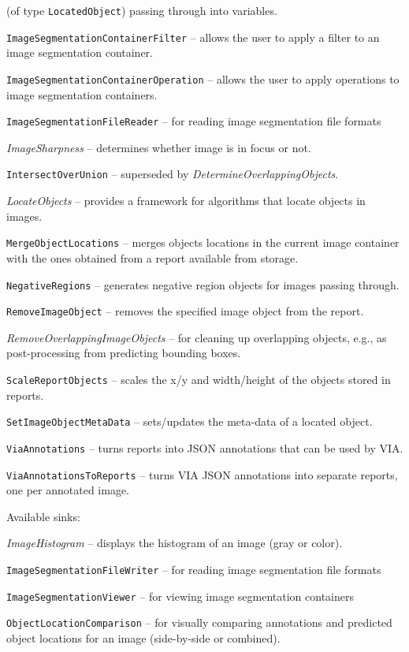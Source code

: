 \documentclass[a4paper]{book}
\begin{document}
\begin{tight_itemize}
  (of type \texttt{LocatedObject}) passing through into variables.
  \item \texttt{ImageSegmentationContainerFilter} -- allows the user to apply a
  filter to an image segmentation container.
  \item \texttt{ImageSegmentationContainerOperation} -- allows the user to apply
  operations to image segmentation containers.
  \item \texttt{ImageSegmentationFileReader} -- for reading image segmentation file formats
  \item \textit{ImageSharpness} -- determines whether image is in focus or not.
  \item \texttt{IntersectOverUnion} -- superseded by \textit{DetermineOverlappingObjects}.
  \item \textit{LocateObjects} -- provides a framework for algorithms that
  locate objects in images.
  \item \texttt{MergeObjectLocations} -- merges objects locations
  in the current image container with the ones obtained from a report
  available from storage.
  \item \texttt{NegativeRegions} -- generates negative region objects
  for images passing through.
  \item \texttt{RemoveImageObject} -- removes the specified image object
  from the report.
  \item \textit{RemoveOverlappingImageObjects} -- for cleaning up
  overlapping objects, e.g., as post-processing from predicting bounding
  boxes.
  \item \texttt{ScaleReportObjects} -- scales the x/y and width/height
  of the objects stored in reports.
  \item \texttt{SetImageObjectMetaData} -- sets/updates the meta-data of
  a located object.
  \item \texttt{ViaAnnotations} -- turns reports into JSON annotations that
  can be used by VIA\cite{via}.
  \item \texttt{ViaAnnotationsToReports} -- turns VIA JSON annotations into
  separate reports, one per annotated image.
\end{tight_itemize}

\noindent Available sinks:
\begin{tight_itemize}
  \item \textit{ImageHistogram} -- displays the histogram of an image (gray or color).
  \item \texttt{ImageSegmentationFileWriter} -- for reading image segmentation file formats
  \item \texttt{ImageSegmentationViewer} -- for viewing image segmentation containers
  \item \texttt{ObjectLocationComparison} -- for visually comparing annotations
  and predicted object locations for an image (side-by-side or combined).
\end{tight_itemize}


\end{document}
